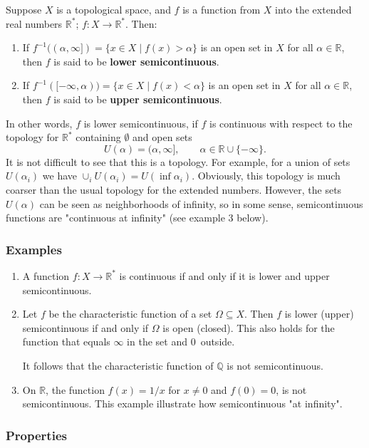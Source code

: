 \documentclass[12pt]{article}
\newcommand{\Q}[0]{\mathbb{Q}}
\begin{document}
Suppose $X$ is a topological space, and $f$ is a function
from $X$ into the extended real numbers $\mathbb{R}^*$; $f:X\to \mathbb{R}^*$.
Then:
\begin{enumerate}
\item
If
$f^{-1}((\alpha,\infty])=\{x\in X \mid f(x) >\alpha\}$ 
is an open set in $X$ for all $\alpha\in \mathbb{R}$,
then $f$ is said to be {\bf lower semicontinuous}.
\item
If
$f^{-1}([-\infty,\alpha))=\{x\in X \mid f(x) <\alpha\}$ 
is an open set in $X$ for all $\alpha\in \mathbb{R}$,
then $f$ is said to be {\bf upper semicontinuous}.
\end{enumerate}

In other words, $f$ is lower semicontinuous, if $f$ is continuous with 
respect to the topology for $\mathbb{R}^*$ containing $\emptyset$ and 
open sets
$$
   U(\alpha) = (\alpha,\infty], \quad \quad \alpha\in \mathbb{R}\cup \{-\infty\}.
$$
It is not difficult to see that this is a topology. For example, 
for a union of sets $U(\alpha_i)$ we have $\cup_i U(\alpha_i)=U(\inf \alpha_i)$. 
Obviously, this topology is much coarser than
the usual topology for the extended numbers. 
However,
the sets $U(\alpha)$ can be seen as neighborhoods of infinity, so
in some sense, semicontinuous functions are "continuous at infinity"
(see example 3 below). 

\subsubsection{Examples}
\begin{enumerate}
\item A function $f\colon X\to \mathbb{R}^*$ is continuous if and only if 
it is lower and upper semicontinuous. 
\item Let $f$ be the characteristic function of a set $\Omega\subseteq X$. 
Then $f$ is lower (upper)
  semicontinuous if and only if $\Omega$ is open (closed).
This also holds for the function that
  equals $\infty$ in the set and $0\,$ outside. 
  
It follows that the characteristic function of $\Q$ is not
semicontinuous.

\item On $\mathbb{R}$, the function $f(x)=1/x$ for $x\neq 0$ and $f(0)=0$, is not
semicontinuous. This example illustrate how semicontinuous "at infinity".
\end{enumerate}
  
\subsubsection{Properties}
\end{document}
